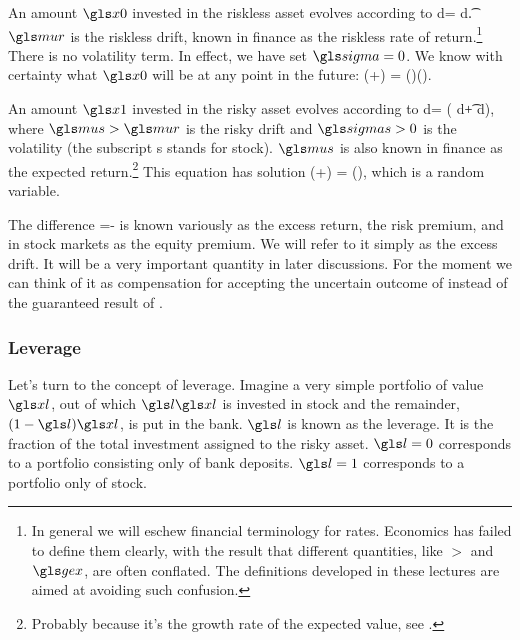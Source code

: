 An amount $\xzero$ invested in the riskless asset evolves according to
\be
d\xzero = \xzero \mur d\t.
\ee
$\mur$ is the riskless drift, known in finance as the riskless rate of return.\footnote{In general we will eschew financial terminology for rates. Economics has failed to define them clearly, with the result that different quantities, like $\gt$ and $\gex$, are often conflated. The definitions developed in these lectures are aimed at avoiding such confusion.} There is no volatility term. In effect, we have set $\gsigma=0$. We know with certainty what $\xzero$ will be at any point in the future: 
\be
\xzero(\tn+\Dt) = \xzero(\tn)\exp(\mur\Dt).
\ee

An amount $\xone$ invested in the risky asset evolves according to
\be
d\xone = \xone ( \mus d\t + \sigmas d\gW ),
\ee
where $\mus>\mur$ is the risky drift and $\sigmas>0$ is the volatility (the subscript s stands for stock). $\mus$ is also known in finance as the expected return.\footnote{Probably because it's the growth rate of the expected value, see .} This equation has solution
\be
\xone(\tn+\Dt) = \xone(\tn)\exp{},
\ee
which is a random variable.

The difference
\be
\mue=\mus-\mur
{}
\ee
is known variously as the excess return, the risk premium, and in stock markets as the equity premium. We will refer to it simply as the excess drift. It will be a very important quantity in later discussions. For the moment we can think of it as compensation for accepting the uncertain outcome of  instead of the guaranteed result of .

\subsubsection{Leverage}
Let's turn to the concept of leverage. Imagine a very simple portfolio of value $\xl$, out of which $\l \xl$ is invested in stock and the remainder, $(1-\l)\xl$, is put in the bank. $\l$ is known as the leverage. It is the fraction of the total investment assigned to the risky asset. $\l=0$ corresponds to a portfolio consisting only of bank deposits. $\l=1$ corresponds to a portfolio only of stock.

